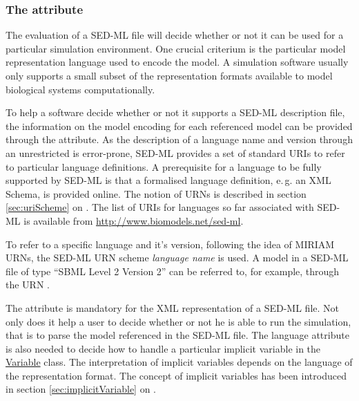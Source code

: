 \subsubsection{The  attribute}
\label{sec:language}
The evaluation of a SED-ML file will decide whether or not it can be used for a particular simulation environment. One crucial criterium is the particular model representation language used to encode the model. A simulation software usually only supports a small subset of the representation formats available to model biological systems computationally. 

To help a software decide whether or not it supports a SED-ML description file, the information on the model encoding for each referenced model can be provided through the  attribute. 
As the description of a language name and version through an unrestricted  is error-prone, SED-ML provides a set of standard URIs to refer to particular language definitions. A prerequisite for a language to be fully supported by SED-ML is that a formalised language definition, e.\,g. an XML Schema, is provided online. The notion of URNs is described in section \ref{sec:uriScheme} on . The list of URIs for languages so far associated with SED-ML is available from \url{http://www.biomodels.net/sed-ml}. 

To refer to a specific language and it's version, following the idea of MIRIAM URNs, the SED-ML URN scheme \emph{language name} is used. A model in a SED-ML file of type ``SBML Level 2 Version 2'' can be referred to, for example, through the URN .

The  attribute is mandatory for the XML representation of a SED-ML file. Not only does it help a user to decide whether or not he is able to run the simulation, that is to parse the model referenced in the SED-ML file. The language attribute is also needed to decide how to handle a particular implicit variable in the \hyperref[class:variable]{Variable} class. The interpretation of implicit variables depends on the language of the representation format. The concept of implicit variables has been introduced in section \ref{sec:implicitVariable} on  .



